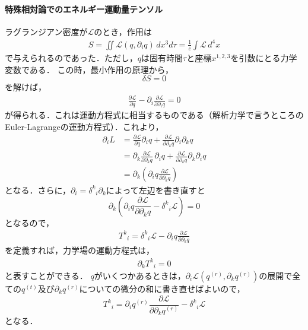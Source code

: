 \documentclass[a4paper]{ltjsreport}
\begin{document}
\paragraph{特殊相対論でのエネルギー運動量テンソル}
ラグランジアン密度が${\mathcal{L}}$のとき，作用は
\begin{align}
  S=\iint{\mathcal{L}}\left(q,\partial_iq\right)\,dx^3d\tau=\frac{1}{c}\int{}\mathcal{L}\,d^4x
\end{align}
で与えられるのであった．ただし，$q$は固有時間$\tau$と座標$x^{1,2,3}$を引数にとる力学変数である．
この時，最小作用の原理から，
\[\delta{S}=0\]
を解けば，
\begin{align}
  \frac{\partial{\mathcal{L}}}{\partial{q}} - \partial_i\frac{\partial{\mathcal{L}}}{\partial\partial_iq}=0\label{EL_eom}
\end{align}
が得られる．これは運動方程式に相当するものである（解析力学で言うところのEuler-Lagrangeの運動方程式）．これより，
\begin{align*}
  \partial_iL &= \frac{\partial{\mathcal{L}}}{\partial{q}}\partial_iq + \frac{\partial{\mathcal{L}}}{\partial\partial_k{q}}\partial_i\partial_kq\\
  &= \partial_k\frac{\partial{\mathcal{L}}}{\partial\partial_kq}\,\partial_iq + \frac{\partial{\mathcal{L}}}{\partial\partial_k{q}}\partial_k\partial_iq\\
  &= \partial_k\left(\partial_iq\frac{\partial{\mathcal{L}}}{\partial\partial_kq}\right)
\end{align*}
となる．さらに，$\partial_i={\delta^k}_i\partial_k$によって左辺を書き直すと
\[
\partial_k\left(\partial_iq\frac{\partial{\mathcal{L}}}{\partial\partial_kq} - {\delta^k}_i\mathcal{L}\right)=0
\]
となるので，
\begin{align}
  {T^k}_i={\delta^k}_i\mathcal{L} - \partial_iq\frac{\partial{\mathcal{L}}}{\partial\partial_kq}\label{spe_T_mixed}
\end{align}
を定義すれば，力学場の運動方程式は，
\begin{align}
  \partial_k{T^k}_i=0\label{spe_T}
\end{align}
と表すことができる．
$q$がいくつかあるときは，$\partial_i\mathcal{L}\left(q^{(r)},\partial_kq^{(r)}\right)$の展開で全ての$q^{(t)}$及び$\partial_kq^{(r)}$についての微分の和に書き直せばよいので，
\[{T^k}_i=\partial_iq^{(r)}\frac{\partial{\mathcal{L}}}{\partial\partial_kq^{(r)}} - {\delta^k}_i\mathcal{L}\]
となる．
\end{document}
